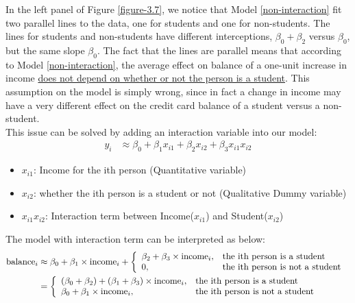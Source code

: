 \documentclass[12pt,a4paper]{article}%
\theoremstyle{definition}
\theoremstyle{plain}
\numberwithin{equation}{section}
\begin{document}
In the left panel of Figure \ref{figure-3.7}, we notice that Model \eqref{non-interaction} fit two parallel lines to the data, one for students and one for non-students.
The lines for students and non-students have different interceptions, $\beta_{0}+\beta_{2}$ versus $\beta_{0}$, but the same slope $\beta_{0}$. 
The fact that the lines are parallel means that according to Model \eqref{non-interaction}, the average effect on balance of a one-unit increase in income \underline{does not depend on whether or not the person is a student}. This assumption on the model is simply wrong, since in fact a change in income may have a very different effect on the credit card balance of a student versus a non-student. \\

This issue can be solved by adding an interaction variable into our model:
\begin{align}
y_{i} & \approx \beta_{0}+ \beta_{1} x_{i1} + \beta_{2} x_{i2} + \beta_{3} x_{i1} x_{i2}
\end{align}

\begin{itemize}
\item $x_{i1}$: Income for the ith person (Quantitative variable)
\item $x_{i2}$: whether the ith person is a student or not (Qualitative Dummy variable)
\item $x_{i1} x_{i2}$: Interaction term between Income($x_{i1}$) and Student($x_{i2}$)
\end{itemize}
The model with interaction term can be interpreted as below:
\begin{align}
{\rm balance}_{i} & \approx \beta_{0}+ \beta_{1} \times {\rm income}_{i} + \left\{
		\begin{array}{ll}
			\beta_{2}+ \beta_{3} \times {\rm income}_{i} , & \mbox{the ith person is a student}\\
			0, & \mbox{the ith person is not a student }\\
		\end{array} \right. \\
& = 	 \left\{
		\begin{array}{ll}
			(\beta_{0} + \beta_{2})+(\beta_{1} + \beta_{3}) \times {\rm income}_{i} , & \mbox{the ith person is a student}\\
			\beta_{0}+ \beta_{1} \times {\rm income}_{i}, & \mbox{the ith person is not a student }\\
		\end{array} \right.
\label{interaction}
\end{align}
\end{document}
